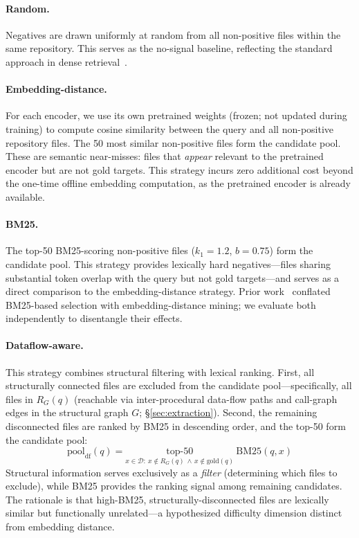 \paragraph{Random.}
Negatives are drawn uniformly at random from all non-positive files within the same repository.
This serves as the no-signal baseline, reflecting the standard approach in dense retrieval~\cite{karpukhin2020dpr}.

\paragraph{Embedding-distance.}
For each encoder, we use its own pretrained weights (frozen; not updated during training) to compute cosine similarity between the query and all non-positive repository files.
The 50 most similar non-positive files form the candidate pool.
These are semantic near-misses: files that \emph{appear} relevant to the pretrained encoder but are not gold targets.
This strategy incurs zero additional cost beyond the one-time offline embedding computation, as the pretrained encoder is already available.

\paragraph{BM25.}
The top-50 BM25-scoring non-positive files ($k_1{=}1.2$, $b{=}0.75$) form the candidate pool.
This strategy provides lexically hard negatives---files sharing substantial token overlap with the query but not gold targets---and serves as a direct comparison to the embedding-distance strategy.
Prior work~\cite{fan2025cocohanere} conflated BM25-based selection with embedding-distance mining; we evaluate both independently to disentangle their effects.

\paragraph{Dataflow-aware.}
This strategy combines structural filtering with lexical ranking.
First, all structurally connected files are excluded from the candidate pool---specifically, all files in $R_G(q)$ (reachable via inter-procedural data-flow paths and call-graph edges in the structural graph $G$; \S\ref{sec:extraction}).
Second, the remaining disconnected files are ranked by BM25 in descending order, and the top-50 form the candidate pool:
\begin{equation}
\text{pool}_{\text{df}}(q) = \underset{x \in \mathcal{D} :\ x \notin R_G(q) \,\wedge\, x \notin \text{gold}(q)}{\text{top-}50}\ \text{BM25}(q, x)
\label{eq:dataflow-pool}
\end{equation}
Structural information serves exclusively as a \emph{filter} (determining which files to exclude), while BM25 provides the ranking signal among remaining candidates.
The rationale is that high-BM25, structurally-disconnected files are lexically similar but functionally unrelated---a hypothesized difficulty dimension distinct from embedding distance.

